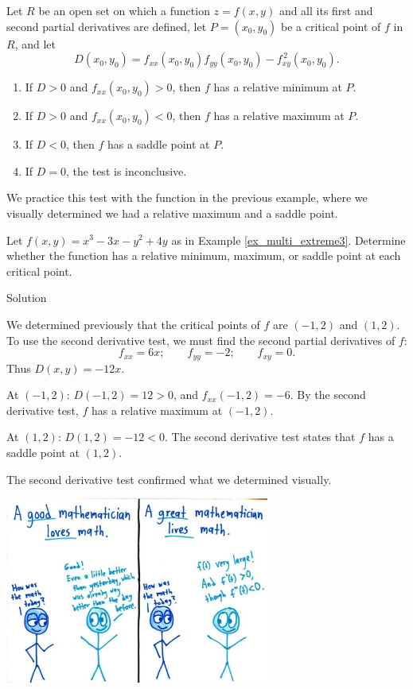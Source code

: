 \begin{theorem}\label{thm:multi_second_test}
Let $R$ be an open set on which a function $z=f(x,y)$ and all its first and second partial derivatives are defined, let $P = (x_0,y_0)$ be a critical point of $f$ in $R$, and let 
$$D(x_0,y_0) = f_{xx}(x_0,y_0)f_{yy}(x_0,y_0)-f_{xy}^{\,2}(x_0,y_0).$$
\begin{enumerate}
	\item If $D>0$ and $f_{xx}(x_0,y_0)>0$, then $f$ has a relative minimum at $P$.
	\item If $D>0$ and $f_{xx}(x_0,y_0)<0$, then $f$ has a relative maximum at $P$.
	\item	If $D<0$, then $f$ has a saddle point at $P$.
	\item If $D=0$, the test is inconclusive.
\end{enumerate}
\end{theorem}

We practice this test with the function in the previous example, where we visually determined we had a relative maximum and a saddle point.\\

\begin{example}\label{ex_multi_extreme4}
Let $f(x,y) = x^3-3x-y^2+4y$ as in Example \ref{ex_multi_extreme3}. Determine whether the function has a relative minimum, maximum, or saddle point at each critical point.


Solution 

We determined previously that the critical points of $f$ are $(-1,2)$ and $(1,2)$. To use the second derivative test, we must find the second partial derivatives of $f$:
$$f_{xx} = 6x;\qquad f_{yy} = -2;\qquad f_{xy} = 0.$$
Thus $D(x,y) = -12x$. 

At $(-1,2)$: $D(-1,2) = 12>0$, and $f_{xx}(-1,2) = -6$. By the second derivative test, $f$ has a relative maximum at $(-1,2)$.

At $(1,2)$: $D(1,2) = -12 <0$. The second derivative test states that $f$ has a saddle point at $(1,2)$.

The second derivative test confirmed what we determined visually.
\end{example}


\fi

	\begin{center}
			\includegraphics[width=0.65\textwidth]{GreatMath_6.jpg}
	\end{center}
 
